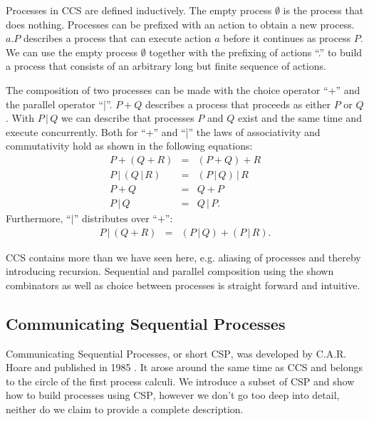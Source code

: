 Processes in \textsc{CCS} are defined inductively. The empty process $\emptyset$ is the process that does nothing. Processes can be prefixed with an action to obtain a new process. $a.P$ describes a process that can execute action $a$ before it continues as process $P$. We can use the empty process $\emptyset$ together with the prefixing of actions \enquote{.} to build a process that consists of an arbitrary long but finite sequence of actions.

The composition of two processes can be made with the choice operator \enquote{+} and the parallel operator \enquote{|}. $P + Q$ describes a process that proceeds as either $P$ or $Q$. With $P \,|\, Q$ we can describe that processes $P$ and $Q$ exist and the same time and execute concurrently. Both for \enquote{+} and \enquote{|} the laws of associativity and commutativity hold as shown in the following equations:
\begin{eqnarray*}
  P + \left( Q + R \right) & = & \left( P + Q \right) + R \\
  P \,|\, \left( Q \,|\, R \right) & = & \left( P \,|\, Q \right) \,|\, R \\
  P + Q & = & Q + P \\
  P \,|\, Q & = & Q \,|\, P.
\end{eqnarray*}
Furthermore, \enquote{$|$} distributes over \enquote{$+$}:
\begin{eqnarray*}
  P \,|\, \left( Q + R \right) & = & \left( P \,|\, Q \right) + \left( P \,|\, R \right).
\end{eqnarray*}

\textsc{CCS} contains more than we have seen here, e.g. aliasing of processes and thereby introducing recursion. Sequential and parallel composition using the shown combinators as well as choice between processes is straight forward and intuitive.

\subsection{Communicating Sequential Processes}
Communicating Sequential Processes, or short \textsc{CSP}, was developed by C.A.R. Hoare and published in 1985 \cite{Hoare:1985:CSP:3921}. It arose around the same time as \textsc{CCS} and belongs to the circle of the first process calculi. We introduce a subset of \textsc{CSP} and show how to build processes using \textsc{CSP}, however we don't go too deep into detail, neither do we claim to provide a complete description.

